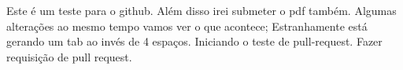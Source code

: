 \documentclass{article}
\begin{document}
	Este é um teste para o github.
	Além disso irei submeter o pdf também.
	Algumas alterações ao mesmo tempo vamos ver o que acontece;
	Estranhamente está gerando um tab ao invés de 4 espaços.
	Iniciando o teste de pull-request.
	Fazer requisição de pull request.
\end{document}
